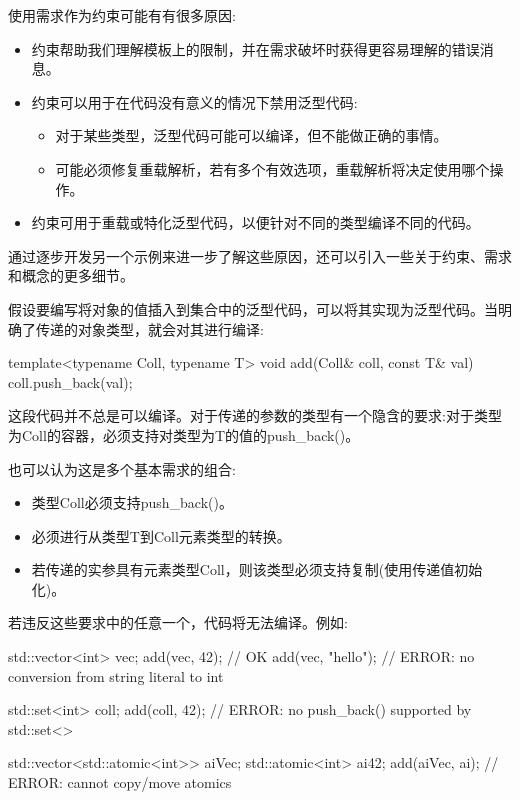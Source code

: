 

使用需求作为约束可能有有很多原因:

\begin{itemize}
\item
约束帮助我们理解模板上的限制，并在需求破坏时获得更容易理解的错误消息。

\item
约束可以用于在代码没有意义的情况下禁用泛型代码:
\begin{itemize}
\item
对于某些类型，泛型代码可能可以编译，但不能做正确的事情。

\item
可能必须修复重载解析，若有多个有效选项，重载解析将决定使用哪个操作。
\end{itemize}

\item
约束可用于重载或特化泛型代码，以便针对不同的类型编译不同的代码。
\end{itemize}

通过逐步开发另一个示例来进一步了解这些原因，还可以引入一些关于约束、需求和概念的更多细节。


假设要编写将对象的值插入到集合中的泛型代码，可以将其实现为泛型代码。当明确了传递的对象类型，就会对其进行编译:

\begin{cpp}
template<typename Coll, typename T>
void add(Coll& coll, const T& val)
{
	coll.push_back(val);
}
\end{cpp}

这段代码并不总是可以编译。对于传递的参数的类型有一个隐含的要求:对于类型为Coll的容器，必须支持对类型为T的值的push\_back()。

也可以认为这是多个基本需求的组合:

\begin{itemize}
\item
类型Coll必须支持push\_back()。

\item
必须进行从类型T到Coll元素类型的转换。

\item
若传递的实参具有元素类型Coll，则该类型必须支持复制(使用传递值初始化)。
\end{itemize}

若违反这些要求中的任意一个，代码将无法编译。例如:

\begin{cpp}
std::vector<int> vec;
add(vec, 42); // OK
add(vec, "hello"); // ERROR: no conversion from string literal to int

std::set<int> coll;
add(coll, 42); // ERROR: no push_back() supported by std::set<>

std::vector<std::atomic<int>> aiVec;
std::atomic<int> ai{42};
add(aiVec, ai); // ERROR: cannot copy/move atomics
\end{cpp}



